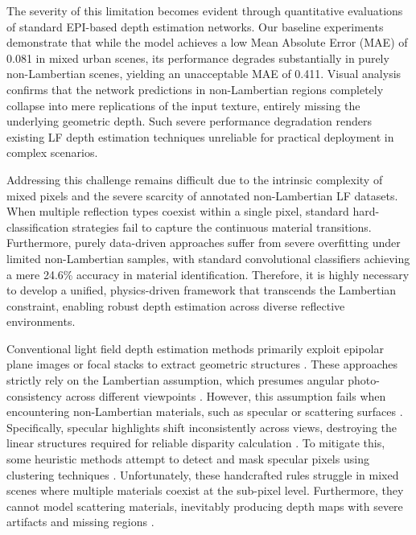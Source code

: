 \documentclass[lettersize,journal]{IEEEtran}
\begin{document}
The severity of this limitation becomes evident through quantitative evaluations of standard EPI-based depth estimation networks. Our baseline experiments demonstrate that while the model achieves a low Mean Absolute Error (MAE) of 0.081 in mixed urban scenes, its performance degrades substantially in purely non-Lambertian scenes, yielding an unacceptable MAE of 0.411. Visual analysis confirms that the network predictions in non-Lambertian regions completely collapse into mere replications of the input texture, entirely missing the underlying geometric depth. Such severe performance degradation renders existing LF depth estimation techniques unreliable for practical deployment in complex scenarios.

Addressing this challenge remains difficult due to the intrinsic complexity of mixed pixels and the severe scarcity of annotated non-Lambertian LF datasets. When multiple reflection types coexist within a single pixel, standard hard-classification strategies fail to capture the continuous material transitions. Furthermore, purely data-driven approaches suffer from severe overfitting under limited non-Lambertian samples, with standard convolutional classifiers achieving a mere 24.6\% accuracy in material identification. Therefore, it is highly necessary to develop a unified, physics-driven framework that transcends the Lambertian constraint, enabling robust depth estimation across diverse reflective environments.

Conventional light field depth estimation methods primarily exploit epipolar plane images or focal stacks to extract geometric structures \cite{EPIfocalstacks}. These approaches strictly rely on the Lambertian assumption, which presumes angular photo-consistency across different viewpoints \cite{Lambertianassumption}. However, this assumption fails when encountering non-Lambertian materials, such as specular or scattering surfaces \cite{nonLambertianmaterials}. Specifically, specular highlights shift inconsistently across views, destroying the linear structures required for reliable disparity calculation \cite{specularhighlights}. To mitigate this, some heuristic methods attempt to detect and mask specular pixels using clustering techniques \cite{heuristicmasking}. Unfortunately, these handcrafted rules struggle in mixed scenes where multiple materials coexist at the sub-pixel level. Furthermore, they cannot model scattering materials, inevitably producing depth maps with severe artifacts and missing regions \cite{scatteringmaterials}.
\end{document}
